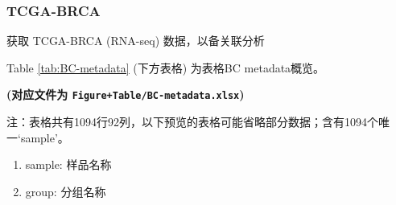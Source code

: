 \documentclass[
]{article}
\providecommand{\tightlist}{%
  \setlength{\itemsep}{0pt}\setlength{\parskip}{0pt}}
\begin{document}
\begin{center}\vspace{1.5cm}\end{center}

\hypertarget{tcga-brca}{%
\subsubsection{TCGA-BRCA}\label{tcga-brca}}

获取 TCGA-BRCA (RNA-seq) 数据，以备关联分析

\begin{center}\vspace{1.5cm}\end{center}

Table \ref{tab:BC-metadata} (下方表格) 为表格BC metadata概览。

\textbf{(对应文件为 \texttt{Figure+Table/BC-metadata.xlsx})}

\begin{center}\begin{tcolorbox}[colback=gray!10, colframe=gray!50, width=0.9\linewidth, arc=1mm, boxrule=0.5pt]注：表格共有1094行92列，以下预览的表格可能省略部分数据；含有1094个唯一`sample'。
\end{tcolorbox}
\end{center}
\begin{center}\begin{tcolorbox}[colback=gray!10, colframe=gray!50, width=0.9\linewidth, arc=1mm, boxrule=0.5pt]\begin{enumerate}\tightlist
\item sample:  样品名称
\item group:  分组名称
\end{enumerate}\end{tcolorbox}
\end{center}
\end{document}
